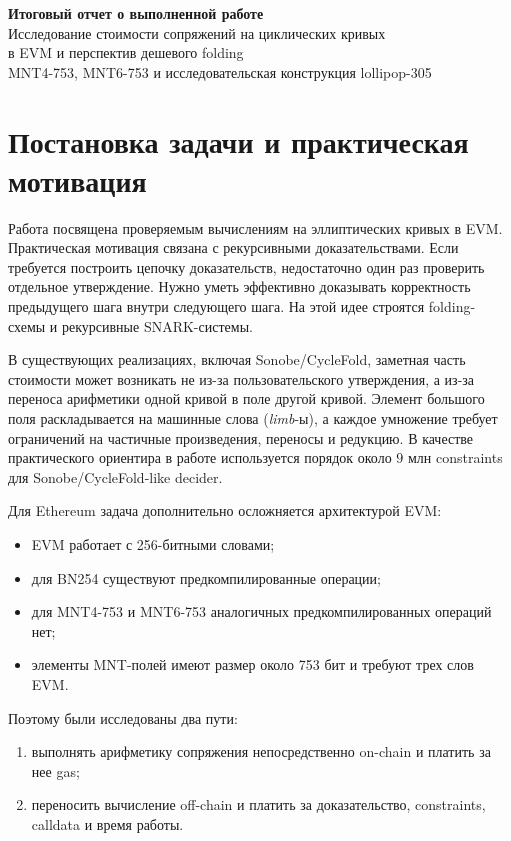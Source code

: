 \documentclass[12pt,a4paper]{article}
\begin{document}
\begin{center}
    {\Large\bfseries Итоговый отчет о выполненной работе}\\[0.4em]
    {\large Исследование стоимости сопряжений на циклических кривых\\
    в EVM и перспектив дешевого folding}\\[0.4em]
    {\normalsize MNT4-753, MNT6-753 и исследовательская конструкция lollipop-305}
\end{center}

\tableofcontents
\vspace{0.4em}

\section{Постановка задачи и практическая мотивация}

Работа посвящена проверяемым вычислениям на эллиптических кривых в EVM.
Практическая мотивация связана с рекурсивными доказательствами. Если требуется
построить цепочку доказательств, недостаточно один раз проверить отдельное
утверждение. Нужно уметь эффективно доказывать корректность предыдущего шага
внутри следующего шага. На этой идее строятся folding-схемы и рекурсивные
SNARK-системы.

В существующих реализациях, включая Sonobe/CycleFold, заметная часть стоимости
может возникать не из-за пользовательского утверждения, а из-за переноса
арифметики одной кривой в поле другой кривой. Элемент большого поля раскладывается на машинные слова (\emph{limb}-ы), а каждое умножение требует ограничений на частичные
произведения, переносы и редукцию. В качестве практического ориентира в работе
используется порядок около $9$ млн constraints для Sonobe/CycleFold-like
decider.

Для Ethereum задача дополнительно осложняется архитектурой EVM:
\begin{itemize}
    \item EVM работает с 256-битными словами;
    \item для BN254 существуют предкомпилированные операции;
    \item для MNT4-753 и MNT6-753 аналогичных предкомпилированных операций нет;
    \item элементы MNT-полей имеют размер около 753 бит и требуют трех слов EVM.
\end{itemize}

Поэтому были исследованы два  пути:
\begin{enumerate}
    \item выполнять арифметику сопряжения непосредственно on-chain и платить
    за нее gas;
    \item переносить вычисление off-chain и платить за доказательство,
    constraints, calldata и время работы.
\end{enumerate}
\end{document}
